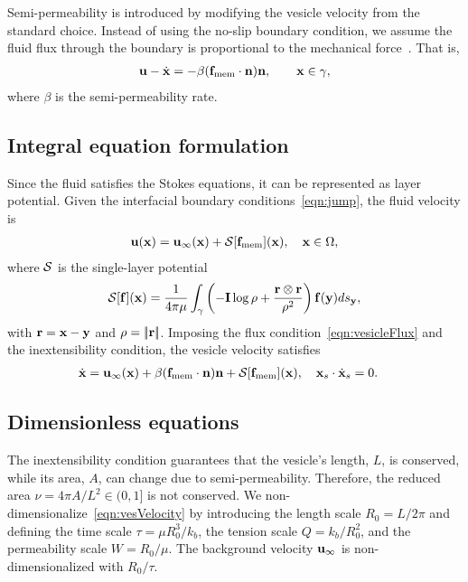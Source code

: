 \documentclass[9pt,twocolumn,twoside,lineno]{pnas-new}
\begin{document}
Semi-permeability is introduced by modifying the vesicle velocity from
the standard choice. Instead of using the no-slip boundary condition, we
assume the fluid flux through the boundary is proportional to the
mechanical force~\cite{yao-mor2017}. That is, 
\begin{align}
  \label{eqn:vesicleFlux}
  \mathbf{u} - \dot{\mathbf{x}} = - \beta (\mathbf{f}_\mathrm{mem} \cdot \mathbf{n}) \mathbf{n}, \qquad
  \mathbf{x} \in \gamma,
\end{align}
where $\beta$ is the semi-permeability rate.  


\subsection*{Integral equation formulation}
Since the fluid satisfies the Stokes equations, it can be represented as
layer potential. Given the interfacial boundary
conditions~\eqref{eqn:jump}, the fluid velocity is
\begin{align}
  \mathbf{u}(\mathbf{x}) = \mathbf{u}_\infty(\mathbf{x}) + \mathcal{S}[\mathbf{f}_\mathrm{mem}](\mathbf{x}), \quad
    \mathbf{x} \in \Omega,
\end{align}
where $\mathcal{S}$ is the single-layer potential
\begin{align}
  \mathcal{S}[\mathbf{f}](\mathbf{x}) = \frac{1}{4\pi\mu} \int_{\gamma} \left(
    -\mathbf{I} \log\rho + \frac{\mathbf{r} \otimes \mathbf{r}}{\rho^2} \right)
    \mathbf{f}(\mathbf{y}) ds_{\mathbf{y}},
\end{align}
with $\mathbf{r} = \mathbf{x} - \mathbf{y}$ and $\rho = |\!| \mathbf{r} |\!|$. Imposing the flux
condition~\eqref{eqn:vesicleFlux} and the inextensibility condition, the
vesicle velocity satisfies
\begin{align}
  \label{eqn:vesVelocity}
  \dot{\mathbf{x}} &= \mathbf{u}_\infty(\mathbf{x}) + \beta (\mathbf{f}_\mathrm{mem}\cdot\mathbf{n})\mathbf{n}
  + \mathcal{S} [\mathbf{f}_\mathrm{mem}](\mathbf{x}),  \quad
  \mathbf{x}_s \cdot \dot{\mathbf{x}}_s = 0.
\end{align}

\subsection*{Dimensionless equations}
The inextensibility condition guarantees that the vesicle's length, $L$,
is conserved, while its area, $A$, can change due to semi-permeability.
Therefore, the reduced area $\nu = 4\pi A/L^2 \in (0,1]$ is not
conserved. We non-dimensionalize~\eqref{eqn:vesVelocity} by introducing
the length scale $R_0 = L/2\pi$ and defining the time scale $\tau = \mu
R_0^3/k_b$, the tension scale $Q = k_b/R_0^2$, and the permeability
scale $W = R_0/\mu$. The background velocity $\mathbf{u}_\infty$ is
non-dimensionalized with $R_0/\tau$.
\end{document}
